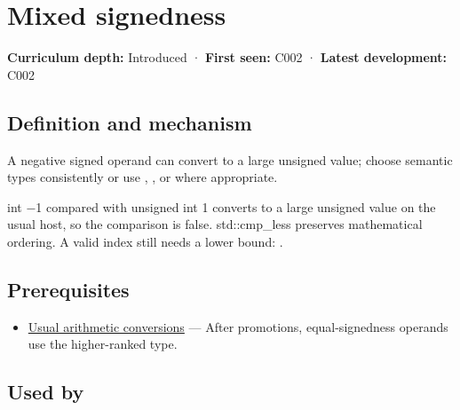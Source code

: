 \hypertarget{appendix-736a2345de4a}{}\label{referencestart:appendix-736a2345de4a}
\section{Mixed signedness}\label{appendix-736a2345de4a-mixed-signedness}

\hypertarget{appendix-736a2345de4a-mixed-signedness}{}

\textbf{Curriculum depth:} Introduced · \textbf{First seen:} C002 · \textbf{Latest development:} C002

\begin{allmightroledefinition}

\subsection{Definition and mechanism}\label{appendix-736a2345de4a-definition-and-mechanism}

\hypertarget{appendix-736a2345de4a-definition-and-mechanism}{}

A negative signed operand can convert to a large unsigned value; choose semantic types consistently or use , , or  where appropriate.

\end{allmightroledefinition}

int −1 compared with unsigned int 1 converts to a large unsigned value on the usual host, so the comparison is false. std::cmp\_less preserves mathematical ordering. A valid index still needs a lower bound: .

\subsection{Prerequisites}\label{appendix-736a2345de4a-prerequisites}

\hypertarget{appendix-736a2345de4a-prerequisites}{}

\begin{itemize}
\tightlist
\item
  \hyperref[appendix-5e2d663adf7f]{Usual arithmetic conversions} --- After promotions, equal-signedness operands use the higher-ranked type.
\end{itemize}

\subsection{Used by}\label{appendix-736a2345de4a-used-by}

